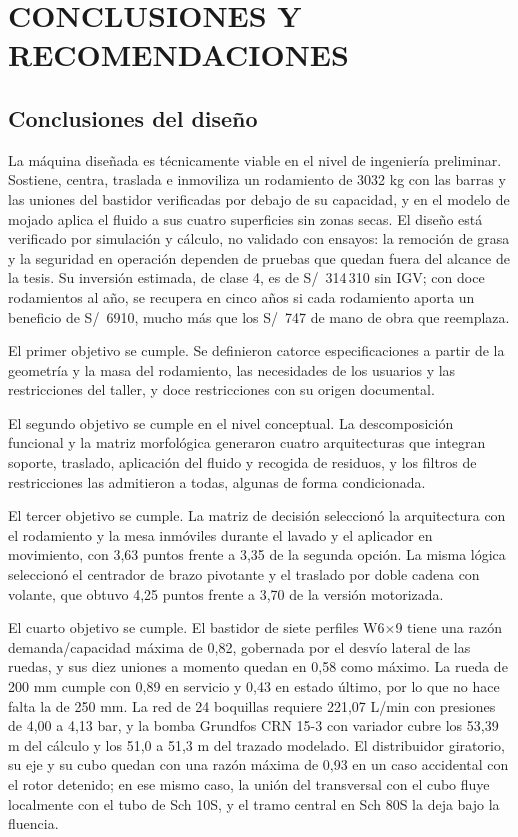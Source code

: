 \chapter{CONCLUSIONES Y RECOMENDACIONES}
\label{cap:conclusiones}

\section{Conclusiones del diseño}

La máquina diseñada es técnicamente viable en el nivel de ingeniería preliminar. Sostiene, centra, traslada e inmoviliza un rodamiento de 3032 kg con las barras y las uniones del bastidor verificadas por debajo de su capacidad, y en el modelo de mojado aplica el fluido a sus cuatro superficies sin zonas secas. El diseño está verificado por simulación y cálculo, no validado con ensayos: la remoción de grasa y la seguridad en operación dependen de pruebas que quedan fuera del alcance de la tesis. Su inversión estimada, de clase 4, es de S/~314\,310 sin IGV; con doce rodamientos al año, se recupera en cinco años si cada rodamiento aporta un beneficio de S/~6910, mucho más que los S/~747 de mano de obra que reemplaza.

El primer objetivo se cumple. Se definieron catorce especificaciones a partir de la geometría y la masa del rodamiento, las necesidades de los usuarios y las restricciones del taller, y doce restricciones con su origen documental.

El segundo objetivo se cumple en el nivel conceptual. La descomposición funcional y la matriz morfológica generaron cuatro arquitecturas que integran soporte, traslado, aplicación del fluido y recogida de residuos, y los filtros de restricciones las admitieron a todas, algunas de forma condicionada.

El tercer objetivo se cumple. La matriz de decisión seleccionó la arquitectura con el rodamiento y la mesa inmóviles durante el lavado y el aplicador en movimiento, con 3,63 puntos frente a 3,35 de la segunda opción. La misma lógica seleccionó el centrador de brazo pivotante y el traslado por doble cadena con volante, que obtuvo 4,25 puntos frente a 3,70 de la versión motorizada.

El cuarto objetivo se cumple. El bastidor de siete perfiles W6$\times$9 tiene una razón demanda/capacidad máxima de 0,82, gobernada por el desvío lateral de las ruedas, y sus diez uniones a momento quedan en 0,58 como máximo. La rueda de 200 mm cumple con 0,89 en servicio y 0,43 en estado último, por lo que no hace falta la de 250 mm. La red de 24 boquillas requiere 221,07 L/min con presiones de 4,00 a 4,13 bar, y la bomba Grundfos CRN 15-3 con variador cubre los 53,39 m del cálculo y los 51,0 a 51,3 m del trazado modelado. El distribuidor giratorio, su eje y su cubo quedan con una razón máxima de 0,93 en un caso accidental con el rotor detenido; en ese mismo caso, la unión del transversal con el cubo fluye localmente con el tubo de Sch 10S, y el tramo central en Sch 80S la deja bajo la fluencia.

